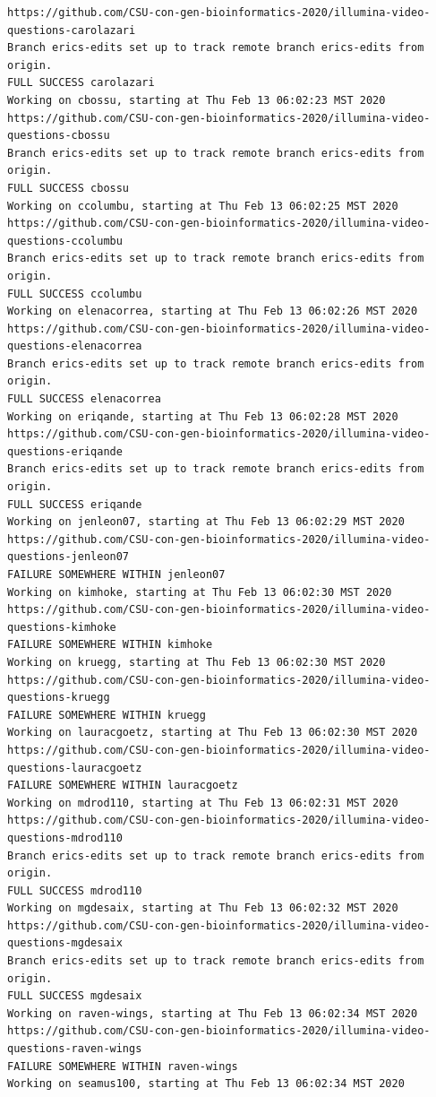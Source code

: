 \documentclass[]{krantz}
\begin{document}
\begin{verbatim}
https://github.com/CSU-con-gen-bioinformatics-2020/illumina-video-questions-carolazari
Branch erics-edits set up to track remote branch erics-edits from origin.
FULL SUCCESS carolazari
Working on cbossu, starting at Thu Feb 13 06:02:23 MST 2020
https://github.com/CSU-con-gen-bioinformatics-2020/illumina-video-questions-cbossu
Branch erics-edits set up to track remote branch erics-edits from origin.
FULL SUCCESS cbossu
Working on ccolumbu, starting at Thu Feb 13 06:02:25 MST 2020
https://github.com/CSU-con-gen-bioinformatics-2020/illumina-video-questions-ccolumbu
Branch erics-edits set up to track remote branch erics-edits from origin.
FULL SUCCESS ccolumbu
Working on elenacorrea, starting at Thu Feb 13 06:02:26 MST 2020
https://github.com/CSU-con-gen-bioinformatics-2020/illumina-video-questions-elenacorrea
Branch erics-edits set up to track remote branch erics-edits from origin.
FULL SUCCESS elenacorrea
Working on eriqande, starting at Thu Feb 13 06:02:28 MST 2020
https://github.com/CSU-con-gen-bioinformatics-2020/illumina-video-questions-eriqande
Branch erics-edits set up to track remote branch erics-edits from origin.
FULL SUCCESS eriqande
Working on jenleon07, starting at Thu Feb 13 06:02:29 MST 2020
https://github.com/CSU-con-gen-bioinformatics-2020/illumina-video-questions-jenleon07
FAILURE SOMEWHERE WITHIN jenleon07
Working on kimhoke, starting at Thu Feb 13 06:02:30 MST 2020
https://github.com/CSU-con-gen-bioinformatics-2020/illumina-video-questions-kimhoke
FAILURE SOMEWHERE WITHIN kimhoke
Working on kruegg, starting at Thu Feb 13 06:02:30 MST 2020
https://github.com/CSU-con-gen-bioinformatics-2020/illumina-video-questions-kruegg
FAILURE SOMEWHERE WITHIN kruegg
Working on lauracgoetz, starting at Thu Feb 13 06:02:30 MST 2020
https://github.com/CSU-con-gen-bioinformatics-2020/illumina-video-questions-lauracgoetz
FAILURE SOMEWHERE WITHIN lauracgoetz
Working on mdrod110, starting at Thu Feb 13 06:02:31 MST 2020
https://github.com/CSU-con-gen-bioinformatics-2020/illumina-video-questions-mdrod110
Branch erics-edits set up to track remote branch erics-edits from origin.
FULL SUCCESS mdrod110
Working on mgdesaix, starting at Thu Feb 13 06:02:32 MST 2020
https://github.com/CSU-con-gen-bioinformatics-2020/illumina-video-questions-mgdesaix
Branch erics-edits set up to track remote branch erics-edits from origin.
FULL SUCCESS mgdesaix
Working on raven-wings, starting at Thu Feb 13 06:02:34 MST 2020
https://github.com/CSU-con-gen-bioinformatics-2020/illumina-video-questions-raven-wings
FAILURE SOMEWHERE WITHIN raven-wings
Working on seamus100, starting at Thu Feb 13 06:02:34 MST 2020

\end{verbatim}
\end{document}
